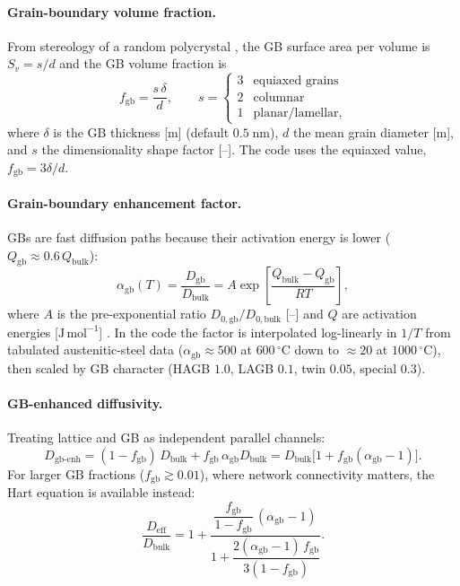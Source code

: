 \documentclass[11pt,a4paper]{article}
\newcommand{\Deff}{D_{\mathrm{eff}}}
\newcommand{\fgb}{f_{\mathrm{gb}}}
\begin{document}
\paragraph{Grain-boundary volume fraction.} From stereology of a random
polycrystal \citep{underwood1970}, the GB surface area per volume is
$S_v = s/d$ and the GB volume fraction is
\begin{equation}
  \fgb = \frac{s\,\delta}{d}, \qquad
  s = \begin{cases} 3 & \text{equiaxed grains}\\ 2 & \text{columnar}\\ 1 & \text{planar/lamellar}, \end{cases}
  \label{eq:fgb}
\end{equation}
where $\delta$ is the GB thickness [m] (default $0.5\;\mathrm{nm}$), $d$ the
mean grain diameter [m], and $s$ the dimensionality shape factor [--]. The
code uses the equiaxed value, $\fgb = 3\delta/d$.

\paragraph{Grain-boundary enhancement factor.} GBs are fast diffusion paths
because their activation energy is lower ($Q_{\mathrm{gb}} \approx
0.6\,Q_{\mathrm{bulk}}$):
\begin{equation}
  \alpha_{\mathrm{gb}}(T) = \frac{D_{\mathrm{gb}}}{D_{\mathrm{bulk}}}
  = A \exp\!\left[\frac{Q_{\mathrm{bulk}} - Q_{\mathrm{gb}}}{RT}\right],
  \label{eq:gbenh}
\end{equation}
where $A$ is the pre-exponential ratio $D_{0,\mathrm{gb}}/D_{0,\mathrm{bulk}}$
[--] and $Q$ are activation energies [$\mathrm{J\,mol^{-1}}$]
\citep{tsuru1982,brass1996}. In the code the factor is interpolated
log-linearly in $1/T$ from tabulated austenitic-steel data
($\alpha_{\mathrm{gb}} \approx 500$ at $600\,^\circ$C down to $\approx 20$ at
$1000\,^\circ$C), then scaled by GB character (HAGB $1.0$, LAGB $0.1$, twin
$0.05$, special $0.3$).

\paragraph{GB-enhanced diffusivity.} Treating lattice and GB as independent
parallel channels:
\begin{equation}
  D_{\mathrm{gb\text{-}enh}}
  = (1-\fgb)\,D_{\mathrm{bulk}} + \fgb\,\alpha_{\mathrm{gb}} D_{\mathrm{bulk}}
  = D_{\mathrm{bulk}}\bigl[1 + \fgb(\alpha_{\mathrm{gb}}-1)\bigr].
  \label{eq:gbparallel}
\end{equation}
For larger GB fractions ($\fgb \gtrsim 0.01$), where network connectivity
matters, the Hart equation \citep{hart1957} is available instead:
\begin{equation}
  \frac{\Deff}{D_{\mathrm{bulk}}}
  = 1 + \frac{\dfrac{\fgb}{1-\fgb}\,( \alpha_{\mathrm{gb}} - 1)}
             {1 + \dfrac{2(\alpha_{\mathrm{gb}}-1)\,\fgb}{3(1-\fgb)}}.
  \label{eq:hart}
\end{equation}
\end{document}
